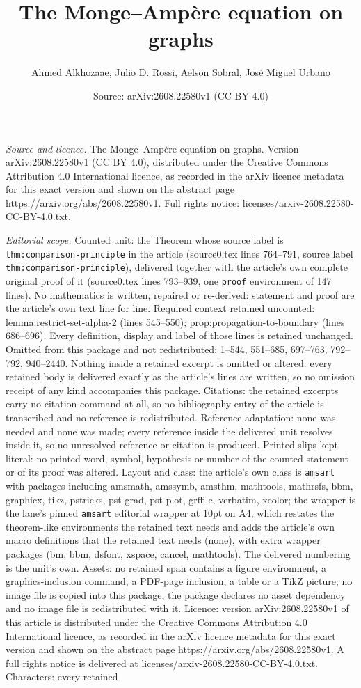 \documentclass[10pt,a4paper]{amsart}
\title[The Monge--Amp\`ere equation on graphs]{The Monge--Amp\`ere equation on graphs}
\author{Ahmed Alkhozaae, Julio D. Rossi, Aelson Sobral, Jos\'e Miguel Urbano}
\date{Source: arXiv:2608.22580v1 (CC BY 4.0)}
\begin{document}
\maketitle

\noindent\emph{Source and licence.} The Monge--Amp\`ere equation on graphs. Version arXiv:2608.22580v1 (CC BY 4.0), distributed under the Creative Commons Attribution 4.0 International licence, as recorded in the arXiv licence metadata for this exact version and shown on the abstract page https://arxiv.org/abs/2608.22580v1. Full rights notice: licenses/arxiv-2608.22580-CC-BY-4.0.txt.\par\smallskip

\noindent\textit{Editorial scope.} Counted unit: the Theorem whose source label is \texttt{thm:comparison-principle} in the article (source0.tex lines 764--791, source label \texttt{thm:comparison-principle}), delivered together with the article's own complete original proof of it (source0.tex lines 793--939, one \texttt{proof} environment of 147 lines). No mathematics is written, repaired or re-derived: statement and proof are the article's own text line for line. Required context retained uncounted: lemma:restrict-set-alpha-2 (lines 545--550); prop:propagation-to-boundary (lines 686--696). Every definition, display and label of those lines is retained unchanged. Omitted from this package and not redistributed: 1--544, 551--685, 697--763, 792--792, 940--2440. Nothing inside a retained excerpt is omitted or altered: every retained body is delivered exactly as the article's lines are written, so no omission receipt of any kind accompanies this package. Citations: the retained excerpts carry no citation command at all, so no bibliography entry of the article is transcribed and no reference is redistributed. Reference adaptation: none was needed and none was made; every reference inside the delivered unit resolves inside it, so no unresolved reference or citation is produced. Printed slips kept literal: no printed word, symbol, hypothesis or number of the counted statement or of its proof was altered. Layout and class: the article's own class is \texttt{amsart} with packages including amsmath, amssymb, amsthm, mathtools, mathrsfs, bbm, graphicx, tikz, pstricks, pst-grad, pst-plot, grffile, verbatim, xcolor; the wrapper is the lane's pinned \texttt{amsart} editorial wrapper at 10pt on A4, which restates the theorem-like environments the retained text needs and adds the article's own macro definitions that the retained text needs (none), with extra wrapper packages (bm, bbm, dsfont, xspace, cancel, mathtools). The delivered numbering is the unit's own. Assets: no retained span contains a figure environment, a graphics-inclusion command, a PDF-page inclusion, a table or a TikZ picture; no image file is copied into this package, the package declares no asset dependency and no image file is redistributed with it. Licence: version arXiv:2608.22580v1 of this article is distributed under the Creative Commons Attribution 4.0 International licence, as recorded in the arXiv licence metadata for this exact version and shown on the abstract page https://arxiv.org/abs/2608.22580v1. A full rights notice is delivered at licenses/arxiv-2608.22580-CC-BY-4.0.txt. Characters: every retained 
\end{document}
